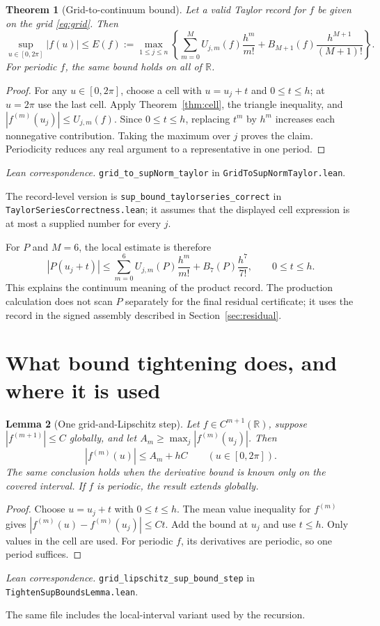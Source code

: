 \documentclass[11pt]{article}
\newtheorem{theorem}{Theorem}[section]
\newtheorem{lemma}[theorem]{Lemma}
\theoremstyle{definition}
\theoremstyle{remark}
\newcommand{\R}{\mathbb R}
\newcommand{\code}[1]{\nolinkurl{#1}}
\newcommand{\leanref}[2]{\par\smallskip\noindent\textit{Lean correspondence.}
  \code{#1} in \code{#2}.\par\smallskip}
\numberwithin{equation}{section}
\begin{document}
\begin{theorem}[Grid-to-continuum bound]
\label{thm:grid}
Let a valid Taylor record for $f$ be given on the grid \eqref{eq:grid}.
Then
\begin{equation}
 \sup_{u\in[0,2\pi]}|f(u)|\leq E(f):=
 \max_{1\leq j\leq n}\left\{
 \sum_{m=0}^{M}U_{j,m}(f)\frac{h^m}{m!}
 +B_{M+1}(f)\frac{h^{M+1}}{(M+1)!}\right\}.
 \label{eq:global-scan}
\end{equation}
For periodic $f$, the same bound holds on all of $\R$.
\end{theorem}
\begin{proof}
For any $u\in[0,2\pi]$, choose a cell with $u=u_j+t$ and $0\leq t\leq h$;
at $u=2\pi$ use the last cell. Apply Theorem~\ref{thm:cell}, the triangle
inequality, and $|f^{(m)}(u_j)|\leq U_{j,m}(f)$. Since $0\leq t\leq h$,
replacing $t^m$ by $h^m$ increases each nonnegative contribution. Taking
the maximum over $j$ proves the claim. Periodicity reduces any real
argument to a representative in one period.
\end{proof}
\leanref{grid_to_supNorm_taylor}{GridToSupNormTaylor.lean}
The record-level version is \code{sup_bound_taylorseries_correct} in
\code{TaylorSeriesCorrectness.lean}; it assumes that the displayed
cell expression is at most a supplied number for every $j$.

For $P$ and $M=6$, the local estimate is therefore
\begin{equation}
 |P(u_j+t)|\leq\sum_{m=0}^{6}U_{j,m}(P)\frac{h^m}{m!}
       +B_7(P)\frac{h^7}{7!},\qquad0\leq t\leq h.
 \label{eq:P-cell}
\end{equation}
This explains the continuum meaning of the product record. The production
calculation does not scan $P$ separately for the final residual certificate;
it uses the record in the signed assembly described in
Section~\ref{sec:residual}.

\section{What bound tightening does, and where it is used}
\label{sec:tightening}

\begin{lemma}[One grid-and-Lipschitz step]
\label{lem:lipschitz}
Let $f\in C^{m+1}(\R)$, suppose $|f^{(m+1)}|\leq C$ globally, and let
$A_m\geq\max_j|f^{(m)}(u_j)|$. Then
\begin{equation}
 |f^{(m)}(u)|\leq A_m+hC\qquad(u\in[0,2\pi]).
 \label{eq:lip-step}
\end{equation}
The same conclusion holds when the derivative bound is known only on the
covered interval. If $f$ is periodic, the result extends globally.
\end{lemma}
\begin{proof}
Choose $u=u_j+t$ with $0\leq t\leq h$. The mean value inequality for
$f^{(m)}$ gives $|f^{(m)}(u)-f^{(m)}(u_j)|\leq Ct$. Add the bound at $u_j$
and use $t\leq h$. Only values in the cell are used. For periodic $f$,
its derivatives are periodic, so one period suffices.
\end{proof}
\leanref{grid_lipschitz_sup_bound_step}{TightenSupBoundsLemma.lean}
The same file includes the local-interval variant used by the recursion.
\end{document}
